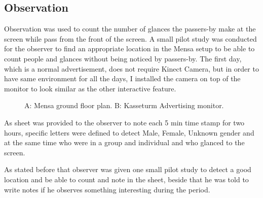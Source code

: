 \subsection{Observation}
Observation was used to count the number of glances the passers-by make at the screen while pass from the front of the screen. A small pilot study was conducted for the observer to find an appropriate location in the Mensa setup to be able to count people and glances without being noticed by passers-by. The first day, which is a normal advertisement, does not require Kinect Camera, but in order to have same environment for all the days, I installed the camera on top of the monitor to look similar as the other interactive feature.

\begin{figure}[!htb]
    \centering
    \hfill
    \caption{A: Mensa ground floor plan. B: Kasseturm Advertising monitor. }%
    \label{fig:observation_env}%
\end{figure}

As sheet was provided to the observer to note each 5 min time stamp for two hours, specific letters were defined to detect Male, Female, Unknown gender and at the same time who were in a group and individual and who glanced to the screen. 

\newpage
As stated before that observer was given one small pilot study to detect a good location and be able to count and note in the sheet, beside that he was told to write notes if he observes something interesting during the period.

